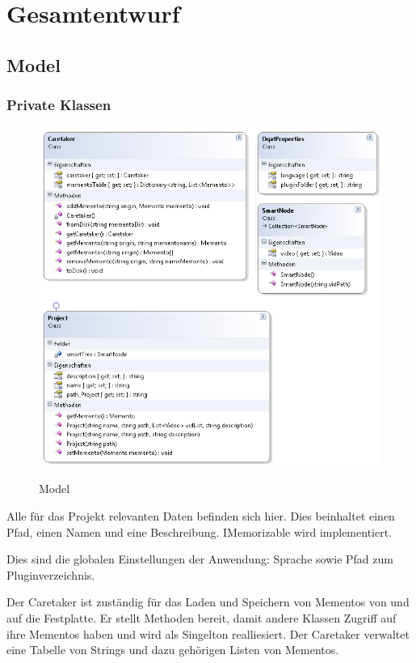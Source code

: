 \chapter{Gesamtentwurf}

\section{Model}

\subsection{Private Klassen}
\begin{figure}[h]
\noindent\includegraphics[scale=1]{bilder/Klassendiagramm/Model.png}
\label{Private Model}
\caption{Model}
\end{figure}

Alle für das Projekt relevanten Daten befinden sich hier. Dies beinhaltet einen Pfad,  einen Namen und eine Beschreibung. IMemorizable wird implementiert.


Dies sind die globalen Einstellungen der Anwendung: Sprache sowie Pfad zum Pluginverzeichnis.


Der Caretaker ist zuständig für das Laden und Speichern von Mementos von und auf die Festplatte.
Er stellt Methoden bereit, damit andere Klassen Zugriff auf ihre Mementos haben und wird als Singelton realliesiert. Der Caretaker verwaltet eine Tabelle von Strings und dazu gehörigen Listen von Mementos. 


